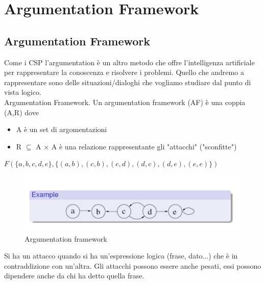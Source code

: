 \chapter{Argumentation Framework} \label{ch:Argumentation Framework}
\section{Argumentation Framework}
Come i CSP l'argumentation è un altro metodo che offre l'intelligenza
artificiale per rappresentare la conoscenza e risolvere i problemi. Quello che
andremo a rappresentare sono delle situazioni/dialoghi che vogliamo studiare dal
punto di vista logico. \\Argumentation Framework. Un argumentation framework
(AF) è una coppia (A,R) dove
\begin{itemize}
    \item A è un set di argomentazioni
    \item R $\subseteq$ A $\times$ A è una relazione rappresentante gli "attacchi"
          ("sconfitte")
\end{itemize}
\begin{center}
    $F(\{a,b,c,d,e\}, \{(a,b),(c,b),(c,d),(d,c),(d,e),(e,e)\})$
\end{center}
\begin{figure}[htp]
    \centering
    \includegraphics[width=12cm, keepaspectratio]{img/Cap6/arg1.png}
    \caption{Argumentation framework}
\end{figure}
Si ha un attacco quando si ha un'espressione logica (frase, dato...) che è in
contraddizione con un'altra. Gli attacchi possono essere anche pesati, essi
possono dipendere anche da chi ha detto quella frase.

